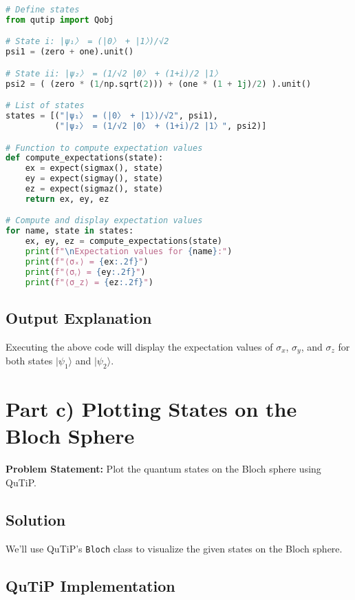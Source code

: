 \documentclass[12pt]{article}
\begin{document}
\begin{lstlisting}[language=Python, caption=Computing Expectation Values in QuTiP]
# Define states
from qutip import Qobj

# State i: |ψ₁〉 = (|0〉 + |1〉)/√2
psi1 = (zero + one).unit()

# State ii: |ψ₂〉 = (1/√2 |0〉 + (1+i)/2 |1〉
psi2 = ( (zero * (1/np.sqrt(2))) + (one * (1 + 1j)/2) ).unit()

# List of states
states = [("|ψ₁〉 = (|0〉 + |1〉)/√2", psi1),
          ("|ψ₂〉 = (1/√2 |0〉 + (1+i)/2 |1〉", psi2)]

# Function to compute expectation values
def compute_expectations(state):
    ex = expect(sigmax(), state)
    ey = expect(sigmay(), state)
    ez = expect(sigmaz(), state)
    return ex, ey, ez

# Compute and display expectation values
for name, state in states:
    ex, ey, ez = compute_expectations(state)
    print(f"\nExpectation values for {name}:")
    print(f"⟨σₓ⟩ = {ex:.2f}")
    print(f"⟨σᵧ⟩ = {ey:.2f}")
    print(f"⟨σ_z⟩ = {ez:.2f}")
\end{lstlisting}

\subsection{Output Explanation}

Executing the above code will display the expectation values of \( \sigma_x \), \( \sigma_y \), and \( \sigma_z \) for both states \( |\psi_1\rangle \) and \( |\psi_2\rangle \).

\newpage

\section{Part c) Plotting States on the Bloch Sphere}

\textbf{Problem Statement:} Plot the quantum states on the Bloch sphere using QuTiP.

\subsection{Solution}

We'll use QuTiP's \texttt{Bloch} class to visualize the given states on the Bloch sphere.

\subsection{QuTiP Implementation}
\end{document}
